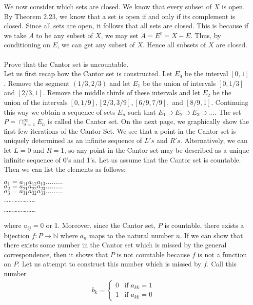 \documentclass[12pt]{article}
\begin{document}
We now consider which sets are closed. We know that every subset of $X$ is open. By Theorem 2.23, we know that a set is open if and only if its complement is closed. Since all sets are open, it follows that all sets are closed. This is because if we take $A$ to be any subset of $X$, we may set $A=E^{c}= X - E$. Thus, by conditioning on $E$, we can get any subset of $X$. Hence all subsets of $X$ are closed. \\ \\


\problem Prove that the Cantor set is uncountable. \\ 

Let us first recap how the Cantor set is constructed. Let $E_{0}$ be the interval $[0,1]$. Remove the segment $(1/3, 2/3)$ and let $E_{1}$ be the union of intervals $[0, 1/3]$ and $[2/3, 1]$. Remove the middle thirds of these intervals and let $E_{2}$ be the union of the intervals $[0 , 1/9 ], [2/3 , 3/9], [6/9 , 7/9],$ and $[8/9 , 1]$. Continuing this way we obtain a sequence of sets $E_{n}$ such that $E_{1} \supset E_{2} \supset E_{3} \supset \ldots .$ The set $P = \cap_{n=1}^{\infty} E_{n}$ is called the Cantor set. On the next page, we graphically show the first few iterations of the Cantor Set. We see that a point in the Cantor set is uniquely determined as an infinite sequence of $L's$ and $R's.$ Alternatively, we can let $L=0$ and $R=1$, so any point in the Cantor set may be described as a unique infinite sequence of 0's and 1's. Let us assume that the Cantor set is countable. Then we can list the elements as follows:
\begin{center}
$a_{1} = a_{11}a_{12}a_{13}\ldots \ldots \ldots$  \\
$a_{2} = a_{21}a_{22}a_{23}\ldots \ldots \ldots$  \\
$a_{3} = a_{31}a_{32}a_{33}\ldots \ldots \ldots$  \\
\ldots \ldots \ldots \ldots \ldots \ldots  \ldots \\
\ldots \ldots \ldots \ldots \ldots \ldots  \ldots
\end{center} 
where $a_{ij}=0$ or 1. Moreover, since the Cantor set, $P$ is countable, there exists a bijection $f: P \rightarrow \mathbb{N}$ where $a_{n}$ maps to the natural number $n$. If we can show that there exists some number in the Cantor set which is missed by the general correspondence, then it shows that $P$ is not countable because $f$ is not a function on $P$. Let us attempt to construct this number which is missed by $f$. Call this number 
\begin{align*}
b_{k} = \begin{cases}
             0  & \text{if } a_{kk}=1  \\
             1  & \text{if } a_{kk}=0
       \end{cases} \quad
\end{align*}
\end{document}
